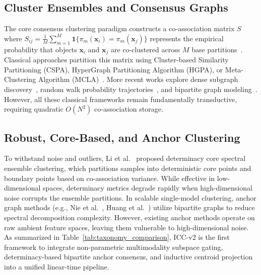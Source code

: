 \documentclass[10pt,conference]{IEEEtran}
\begin{document}
\subsection{Cluster Ensembles and Consensus Graphs}
The core consensus clustering paradigm constructs a co-association matrix $S$ where $S_{ij} = \frac{1}{M}\sum_{m=1}^M \mathbf{1}\{\pi_m(\mathbf{x}_i) = \pi_m(\mathbf{x}_j)\}$ represents the empirical probability that objects $\mathbf{x}_i$ and $\mathbf{x}_j$ are co-clustered across $M$ base partitions~\cite{fred2005combining}. Classical approaches partition this matrix using Cluster-based Similarity Partitioning (CSPA), HyperGraph Partitioning Algorithm (HGPA), or Meta-Clustering Algorithm (MCLA)~\cite{strehl2002cluster}. More recent works explore dense subgraph discovery~\cite{liu2017spectral}, random walk probability trajectories~\cite{huang2015robust}, and bipartite graph modeling~\cite{fern2004solving}. However, all these classical frameworks remain fundamentally transductive, requiring quadratic $O(N^2)$ co-association storage.

\subsection{Robust, Core-Based, and Anchor Clustering}
To withstand noise and outliers, Li et al.~\cite{li2019determinacy} proposed determinacy core spectral ensemble clustering, which partitions samples into deterministic core points and boundary points based on co-association variance. While effective in low-dimensional spaces, determinacy metrics degrade rapidly when high-dimensional noise corrupts the ensemble partitions. In scalable single-model clustering, anchor graph methods (e.g., Nie et al.~\cite{nie2024fast}, Huang et al.~\cite{huang2023fast}) utilize bipartite graphs to reduce spectral decomposition complexity. However, existing anchor methods operate on raw ambient feature spaces, leaving them vulnerable to high-dimensional noise. As summarized in Table~\ref{tab:taxonomy_comparison}, ICC-v2 is the first framework to integrate non-parametric multimodality subspace gating, determinacy-based bipartite anchor consensus, and inductive centroid projection into a unified linear-time pipeline.
\end{document}
